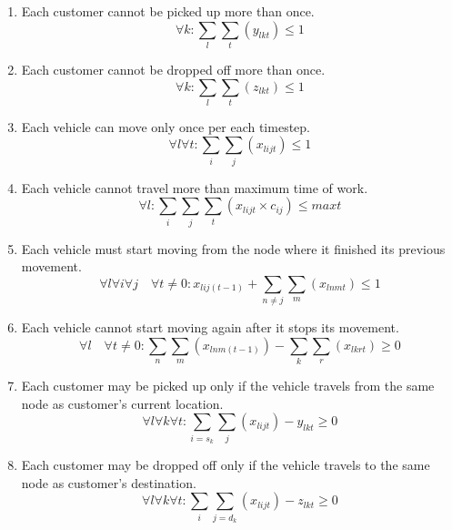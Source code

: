 \documentclass{article}
\begin{document}
\begin{enumerate}
    \item Each customer cannot be picked up more than once.
    \begin{equation}
        \forall k: \sum_l \sum_t (y_{lkt}) \leq 1 
    \end{equation}
    
    \item Each customer cannot be dropped off more than once.
    \begin{equation}
        \forall k: \sum_l \sum_t (z_{lkt}) \leq 1 
    \end{equation}

    \item Each vehicle can move only once per each timestep.
    \begin{equation}
        \forall l \forall t: \sum_i \sum_j (x_{lijt}) \leq 1 
    \end{equation}

    \item Each vehicle cannot travel more than maximum time of work.
    \begin{equation}
        \forall l: \sum_i \sum_j \sum_t (x_{lijt} \times c_{ij}) \leq maxt 
    \end{equation}
    
    \item Each vehicle must start moving from the node where it finished its previous movement.
    \begin{equation}
        \forall l \forall i \forall j \quad \forall t \neq 0: x_{lij(t-1)} + \sum_{n \neq j} \sum_m (x_{lnmt}) \leq 1
    \end{equation}

    \item Each vehicle cannot start moving again after it stops its movement.
    \begin{equation}
        \forall l \quad \forall t \neq 0: \sum_n \sum_m (x_{lnm(t-1)}) - \sum_k \sum_r (x_{lkrt}) \geq 0
    \end{equation}
    
    \item Each customer may be picked up only if the vehicle travels from the same node as customer's current location.
    \begin{equation}
        \forall l \forall k \forall t: \sum_{i = s_k} \sum_j (x_{lijt}) - y_{lkt} \geq 0
    \end{equation}

    \item Each customer may be dropped off only if the vehicle travels to the same node as customer's destination.
    \begin{equation}
        \forall l \forall k \forall t: \sum_i \sum_{j = d_k} (x_{lijt}) - z_{lkt} \geq 0
    \end{equation}


\end{enumerate}
\end{document}
